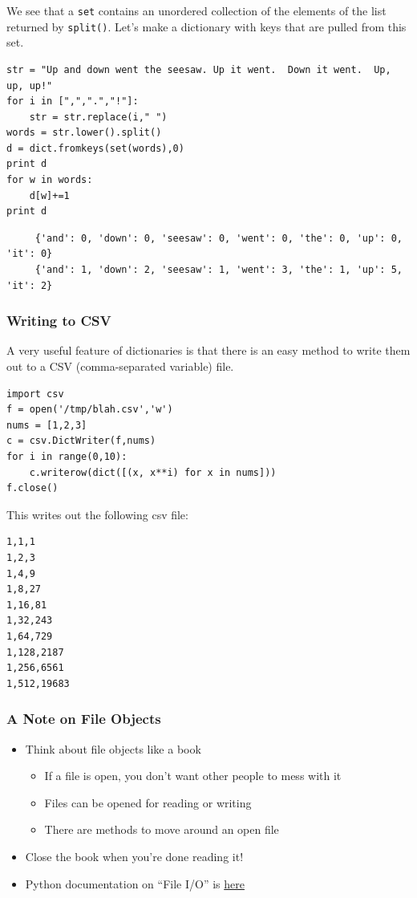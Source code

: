 \documentclass[11pt]{article}
\begin{document}
    We see that a \texttt{set} contains an unordered collection of the
    elements of the list returned by \texttt{split()}.  Let's make a dictionary
    with keys that are pulled from this set.


\begin{verbatim}
str = "Up and down went the seesaw. Up it went.  Down it went.  Up, up, up!"
for i in [",",".","!"]:
    str = str.replace(i," ")
words = str.lower().split()
d = dict.fromkeys(set(words),0)
print d
for w in words:
    d[w]+=1
print d
\end{verbatim}

\begin{verbatim}
     {'and': 0, 'down': 0, 'seesaw': 0, 'went': 0, 'the': 0, 'up': 0, 'it': 0}
     {'and': 1, 'down': 2, 'seesaw': 1, 'went': 3, 'the': 1, 'up': 5, 'it': 2}
\end{verbatim}
\subsubsection{Writing to CSV}
\label{sec-2-7-2}


    A very useful feature of dictionaries is that there is an easy
    method to write them out to a CSV (comma-separated variable) file.


\begin{verbatim}
import csv
f = open('/tmp/blah.csv','w')
nums = [1,2,3]
c = csv.DictWriter(f,nums)
for i in range(0,10):
    c.writerow(dict([(x, x**i) for x in nums]))
f.close()
\end{verbatim}


    This writes out the following csv file:

\begin{verbatim}
1,1,1
1,2,3
1,4,9
1,8,27
1,16,81
1,32,243
1,64,729
1,128,2187
1,256,6561
1,512,19683
\end{verbatim}
\subsubsection{A Note on File Objects}
\label{sec-2-7-3}


\begin{itemize}
\item Think about file objects like a book
\begin{itemize}
\item If a file is open, you don't want other people to mess with it
\item Files can be opened for reading or writing
\item There are methods to move around an open file
\end{itemize}
\item Close the book when you're done reading it!
\item Python documentation on ``File I/O'' is \href{http://docs.python.org/tutorial/inputoutput.html}{here}
\end{itemize}
\end{document}
